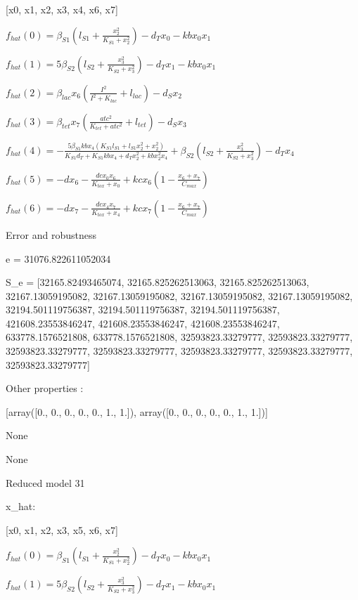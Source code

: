 [x0, x1, x2, x3, x4, x6, x7]


$f_{hat}(0)=\beta_{S1} \left(l_{S1} + \frac{x_{2}^{2}}{K_{S1} + x_{2}^{2}}\right) - d_{T} x_{0} - kb x_{0} x_{1}$


$f_{hat}(1)=5 \beta_{S2} \left(l_{S2} + \frac{x_{3}^{2}}{K_{S2} + x_{3}^{2}}\right) - d_{T} x_{1} - kb x_{0} x_{1}$


$f_{hat}(2)=\beta_{lac} x_{6} \left(\frac{I^{2}}{I^{2} + K_{lac}} + l_{lac}\right) - d_{S} x_{2}$


$f_{hat}(3)=\beta_{tet} x_{7} \left(\frac{atc^{2}}{K_{tet} + atc^{2}} + l_{tet}\right) - d_{S} x_{3}$


$f_{hat}(4)=- \frac{5 \beta_{S1} kb x_{4} \left(K_{S1} l_{S1} + l_{S1} x_{2}^{2} + x_{2}^{2}\right)}{K_{S1} d_{T} + K_{S1} kb x_{4} + d_{T} x_{2}^{2} + kb x_{2}^{2} x_{4}} + \beta_{S2} \left(l_{S2} + \frac{x_{3}^{2}}{K_{S2} + x_{3}^{2}}\right) - d_{T} x_{4}$


$f_{hat}(5)=- d x_{6} - \frac{dc x_{0} x_{6}}{K_{tox} + x_{0}} + kc x_{6} \left(1 - \frac{x_{6} + x_{7}}{C_{max}}\right)$


$f_{hat}(6)=- d x_{7} - \frac{dc x_{4} x_{7}}{K_{tox} + x_{4}} + kc x_{7} \left(1 - \frac{x_{6} + x_{7}}{C_{max}}\right)$



Error and robustness 


e = 31076.822611052034

S_e = [32165.82493465074, 32165.825262513063, 32165.825262513063, 32167.13059195082, 32167.13059195082, 32167.13059195082, 32167.13059195082, 32194.501119756387, 32194.501119756387, 32194.501119756387, 421608.23553846247, 421608.23553846247, 421608.23553846247, 633778.1576521808, 633778.1576521808, 32593823.33279777, 32593823.33279777, 32593823.33279777, 32593823.33279777, 32593823.33279777, 32593823.33279777, 32593823.33279777]

Other properties :


[array([0., 0., 0., 0., 0., 1., 1.]), array([0., 0., 0., 0., 0., 1., 1.])]

None

None

Reduced model 31

x_{hat}: 

[x0, x1, x2, x3, x5, x6, x7]


$f_{hat}(0)=\beta_{S1} \left(l_{S1} + \frac{x_{2}^{2}}{K_{S1} + x_{2}^{2}}\right) - d_{T} x_{0} - kb x_{0} x_{1}$


$f_{hat}(1)=5 \beta_{S2} \left(l_{S2} + \frac{x_{3}^{2}}{K_{S2} + x_{3}^{2}}\right) - d_{T} x_{1} - kb x_{0} x_{1}$


